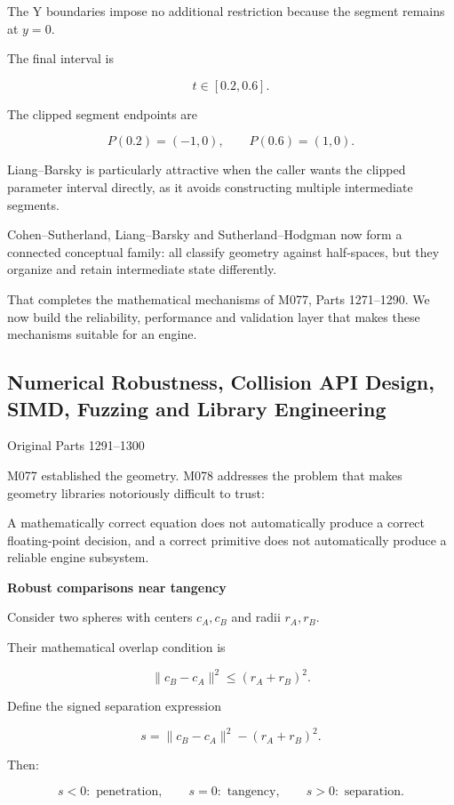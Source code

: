 The Y boundaries impose no additional restriction because the segment remains at \(y=0\).

The final interval is

\[
t\in[0.2,0.6].
\]

The clipped segment endpoints are

\[
P(0.2)=(-1,0),\qquad P(0.6)=(1,0).
\]

Liang--Barsky is particularly attractive when the caller wants the clipped parameter interval directly, as it avoids constructing multiple intermediate segments.

Cohen--Sutherland, Liang--Barsky and Sutherland--Hodgman now form a connected conceptual family: all classify geometry against half-spaces, but they organize and retain intermediate state differently.

That completes the mathematical mechanisms of M077, Parts 1271--1290. We now build the reliability, performance and validation layer that makes these mechanisms suitable for an engine.

\subsection{Numerical Robustness, Collision API Design, SIMD, Fuzzing and Library Engineering}\label{04-visual-computing-ii-ch027-numerical-robustness-collision-api-design-simd-fuzzing-and-library-engineering}

Original Parts 1291--1300

M077 established the geometry. M078 addresses the problem that makes geometry libraries notoriously difficult to trust:

A mathematically correct equation does not automatically produce a correct floating-point decision, and a correct primitive does not automatically produce a reliable engine subsystem.

\textbf{Robust comparisons near tangency}

Consider two spheres with centers \(c_A,c_B\) and radii \(r_A,r_B\).

Their mathematical overlap condition is

\[
\|c_B-c_A\|^2\le(r_A+r_B)^2.
\]

Define the signed separation expression

\[
s=\|c_B-c_A\|^2-(r_A+r_B)^2.
\]

Then:

\[
s<0:\text{ penetration},\qquad s=0:\text{ tangency},\qquad s>0:\text{ separation}.
\]

